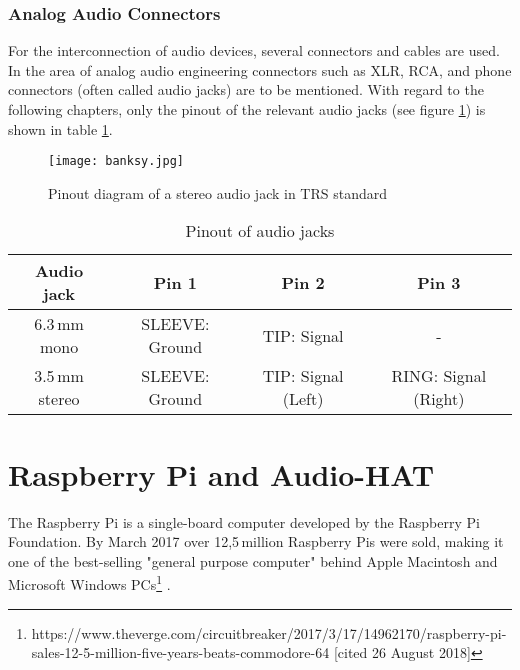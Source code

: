 \subsubsection{Analog Audio Connectors}

For the interconnection of audio devices, several connectors and cables are used.
In the area of analog audio engineering  connectors such as XLR, RCA, and phone connectors (often
called audio jacks) are to be mentioned. With regard to the following chapters, only the pinout of the relevant audio jacks (see figure \ref{fig:Jacks}) is shown in table \ref{tab:pinoutAudioJacks}.


\begin{figure}[H]
	\centering \texttt{[image: banksy.jpg]}
	\caption[Jacks]{Pinout diagram of a stereo audio jack in TRS standard\footnotemark}
	\label{fig:Jacks}
\end{figure}

\begin{table}[H]
\begin{center}
\begin{tabular}{|c|c|c|c|}
\hline 
\textbf{ Audio jack} &\textbf{ Pin 1 }& \textbf{Pin 2} & \textbf{ Pin 3} \\ 
\hline 
\hline
6.3\,mm mono & SLEEVE: Ground & TIP: Signal &  - \\ 
\hline 
3.5\,mm stereo & SLEEVE: Ground & TIP: Signal (Left) & RING: Signal (Right) \\ 
\hline 
\end{tabular} 
\caption{Pinout of audio jacks}
\end{center}
\label{tab:pinoutAudioJacks}
\end{table}

\section{Raspberry Pi and Audio-HAT}\label{cap:TheoryPi}

The Raspberry Pi is a single-board computer developed by the Raspberry Pi Foundation.
By March 2017 over 12,5\,million Raspberry Pis were sold, making it one of the best-selling
"general purpose computer" behind Apple Macintosh and Microsoft Windows PCs\footnote{https://www.theverge.com/circuitbreaker/2017/3/17/14962170/raspberry-pi-sales-12-5-million-five-years-beats-commodore-64 [cited 26 August 2018]} .

